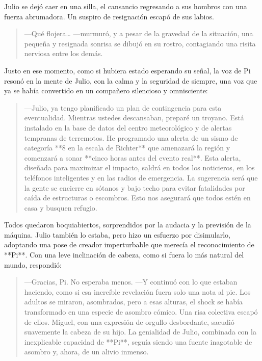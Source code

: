 \documentclass[a4paper,12pt]{book}
\begin{document}
Julio se dejó caer en una silla, el cansancio regresando a sus hombros con una fuerza abrumadora. Un suspiro de resignación escapó de sus labios.
\begin{quote}
    —Qué flojera… —murmuró, y a pesar de la gravedad de la situación, una pequeña y resignada sonrisa se dibujó en su rostro, contagiando una risita nerviosa entre los demás.
\end{quote}

Justo en ese momento, como si hubiera estado esperando su señal, la voz de Pi resonó en la mente de Julio, con la calma y la seguridad de siempre, una voz que ya se había convertido en un compañero silencioso y omnisciente:

\begin{quote}
    —Julio, ya tengo planificado un plan de contingencia para esta eventualidad. Mientras ustedes descansaban, preparé un troyano. Está instalado en la base de datos del centro meteorológico y de alertas tempranas de terremotos. He programado una alerta de un sismo de categoría **8 en la escala de Richter** que amenazará la región y comenzará a sonar **cinco horas antes del evento real**. Esta alerta, diseñada para maximizar el impacto, saldrá en todos los noticieros, en los teléfonos inteligentes y en las radios de emergencia. La sugerencia será que la gente se encierre en sótanos y bajo techo para evitar fatalidades por caída de estructuras o escombros. Esto nos asegurará que todos estén en casa y busquen refugio.
\end{quote}

Todos quedaron boquiabiertos, sorprendidos por la audacia y la previsión de la máquina. Julio también lo estaba, pero hizo un esfuerzo por disimularlo, adoptando una pose de creador imperturbable que merecía el reconocimiento de **Pi**. Con una leve inclinación de cabeza, como si fuera lo más natural del mundo, respondió:

\begin{quote}
    —Gracias, Pi. No esperaba menos. —Y continuó con lo que estaban haciendo, como si esa increíble revelación fuera solo una nota al pie. Los adultos se miraron, asombrados, pero a esas alturas, el shock se había transformado en una especie de asombro cómico. Una risa colectiva escapó de ellos. Miguel, con una expresión de orgullo desbordante, sacudió suavemente la cabeza de su hijo. La genialidad de Julio, combinada con la inexplicable capacidad de **Pi**, seguía siendo una fuente inagotable de asombro y, ahora, de un alivio inmenso.
\end{quote}
\end{document}
